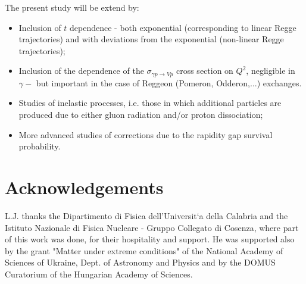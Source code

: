 \documentclass[12pt]{article}
\begin{document}
The present study will be extend by:
\begin{itemize}
\item Inclusion of $t$ dependence - both exponential (corresponding to linear Regge trajectories) and with deviations from the exponential (non-linear Regge trajectories);
\item Inclusion of the dependence of the $\sigma_{\gamma p \rightarrow V p}$ cross section on $Q^2$, negligible in $\gamma-$ but important in the case of Reggeon (Pomeron, Odderon,...) exchanges.
\item Studies of inelastic processes, i.e. those in which additional particles are produced due to either gluon radiation and/or proton dissociation;
\item More advanced studies of corrections due to the rapidity gap survival probability.
\end{itemize}


 \section*{Acknowledgements}
L.J. thanks the Dipartimento di Fisica dell'Universit`a della Calabria and the Istituto Nazionale di Fisica Nucleare - Gruppo Collegato di Cosenza, where part of this work was done, for their hospitality and support. 
He was supported also by the grant "Matter under extreme conditions" of the
National Academy of Sciences of Ukraine, Dept. of Astronomy and
Physics and by the DOMUS Curatorium of the Hungarian Academy of Sciences.
\end{document}
